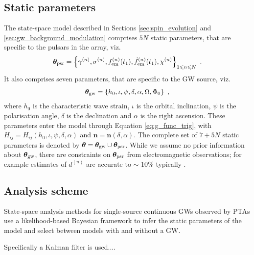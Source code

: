 \documentclass[fleqn,usenatbib,useAMS]{mnras}
\begin{document}
\subsection{Static parameters}\label{sec:summary_of_static_parameters}
The state-space model described in Sections \ref{sec:spin_evolution} and \ref{sec:gw_background_modulation} comprises $5N$ static parameters, that are specific to the pulsars in the array, viz.
\begin{equation}
	\boldsymbol{\theta}_{\rm psr} = \left \{ \gamma^{(n)},\sigma^{(n)}, f_{\rm em}^{(n)}(t_1),\dot{f}_{\rm em}^{(n)}(t_1),\chi^{(n)}\right\}_{1\leq n \leq N} \ .  \label{eq:psrparams}
\end{equation}
It also comprises seven parameters, that are specific to the GW source, viz. 
\begin{equation}
	\boldsymbol{\theta}_{\rm gw} = \left \{h_0, \iota, \psi, \delta, \alpha, \Omega, \Phi_0 \right \} \ ,  \label{eq:params3}
\end{equation}
where $h_0$ is the characteristic wave strain, $\iota$ is the orbital inclination, $\psi$ is the polarisation angle, $\delta$ is the declination and $\alpha$ is the right ascension. These parameters enter the model through Equation \eqref{eq:g_func_trig}, with $H_{ij} = H_{ij}(h_0, \iota, \psi, \delta, \alpha)$ and $\boldsymbol{n}=\boldsymbol{n}(\delta,\alpha)$. The complete set of $7 + 5N$ static parameters is denoted by $\boldsymbol{\theta} = \boldsymbol{\theta}_{\rm gw} \cup \boldsymbol{\theta}_{\rm psr}$. While we assume no prior information about $\boldsymbol{\theta}_{\rm gw}$, there are constraints on $\boldsymbol{\theta}_{\rm psr}$ from electromagnetic observations; for example estimates of $d^{(n)}$ are accurate to $\sim$ 10$\%$ typically \citep{Cordes2002astro.ph..7156C, Verbiest2012ApJ...755...39V, Desvignes2016,Yao2017}.




\subsection{Analysis scheme}
State-space analysis methods for single-source continuous GWs observed by PTAs \citep[e.g.][]{KimpsonPTA1,KimpsonPTA2} use a likelihood-based Bayesian framework to infer the static parameters of the model and select between models with and without a GW. 






Specifically a Kalman filter is used....
\end{document}
